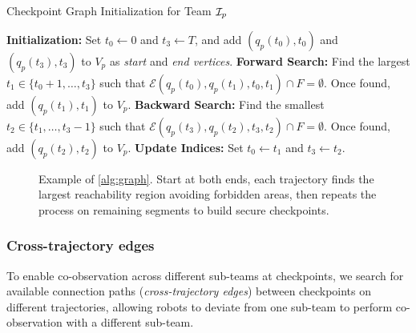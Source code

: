 \documentclass[10pt,twocolumn,twoside]{IEEEtran}
\newcommand{\news}{\color{blue}}
\begin{document}
\begin{algorithm}
	\caption{Checkpoint Graph Initialization for Team $\mathcal{I}_p$}\label{alg:graph}
  \begin{algorithmic}[1]
	{\news \State \textbf{Initialization:} Set $t_{0} \leftarrow 0$ and $t_{3} \leftarrow T$, and add $(q_{p}(t_0),t_0)$ and $(q_{p}(t_3),t_3)$ to $V_{p}$ as \emph{start} and \emph{end vertices}.
		\State \textbf{Forward Search:} Find the largest $t_{1} \in \{t_{0}+1, \dots, t_3\}$ such that $\mathcal{E}(q_{p}(t_{0}),q_{p}(t_{1}), t_{0},t_{1}) \cap F = \emptyset$. Once found, add $(q_{p}(t_{1}),t_{1})$ to $V_{p}$.
		\State \textbf{Backward Search:} Find the smallest $t_2\in\{t_{1}, \dots, t_3-1\}$ such that $
		\mathcal{E}(q_{p}(t_3),q_{p}(t_2), t_3,t_2) \cap F = \emptyset.$ Once found, add $(q_{p}(t_2),t_2)$ to $V_{p}$.
		\State \textbf{Update Indices:} Set $t_{0} \leftarrow t_{1}$ and $t_3 \leftarrow t_2$.
	\EndWhile}
	\end{algorithmic}
	\end{algorithm}
\begin{figure}[h]
	\centering
    \caption{\news Example of \cref{alg:graph}. Start at both ends, each trajectory finds the largest reachability region avoiding forbidden areas, then repeats the process on remaining segments to build secure checkpoints.}\label{fig:checkpoint-generate}
\end{figure}

\subsubsection{Cross-trajectory edges}\label{sec:cross-traj-edges}
To enable co-observation across different sub-teams at checkpoints, we search for available connection paths (\emph{cross-trajectory edges}) between checkpoints on different trajectories, allowing robots to deviate from one sub-team to perform co-observation with a different sub-team. 
\end{document}
